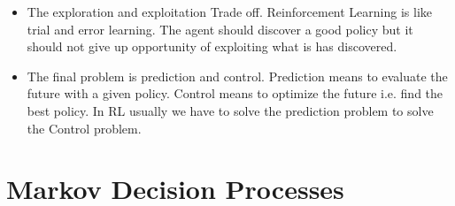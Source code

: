 \documentclass[a4paper]{article}
\begin{document}
\begin{itemize}
\begin{itemize}
\item The exploration and exploitation Trade off. Reinforcement Learning is like trial and error learning. The agent should discover a good policy but it should not give up opportunity of exploiting what is has discovered.
\item The final problem is prediction and control. Prediction means to evaluate the future with a given policy. Control means to optimize the future i.e. find the best policy. In RL usually we have to solve the prediction problem to solve the Control problem. 
\end{itemize}
\end{itemize}

\section{Markov Decision Processes}
\end{document}
